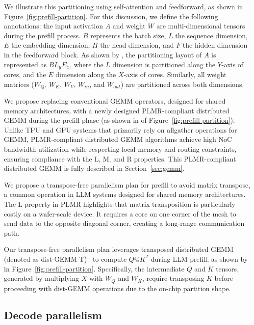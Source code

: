 We illustrate this partitioning using self-attention and feedforward, as shown in Figure~\ref{fig:prefill-partition}. For this discussion, we define the following annotations: the input activation $A$ and weight $W$ are multi-dimensional tensors during the prefill process. $B$ represents the batch size, $L$ the sequence dimension, $E$ the embedding dimension, $H$ the head dimension, and $F$ the hidden dimension in the feedforward block.
As shown by , the partitioning layout of $A$ is represented as $BL_yE_x$, where the $L$ dimension is partitioned along the $Y$-axis of cores, and the $E$ dimension along the $X$-axis of cores. Similarly, all weight matrices ($W_Q$, $W_K$, $W_V$, $W_{in}$, and $W_{out}$) are partitioned across both dimensions. 


We propose replacing conventional GEMM operators, designed for shared memory architectures, with a newly designed PLMR-compliant distributed GEMM during the prefill phase (as shown in  of Figure~\ref{fig:prefill-partition}). Unlike TPU and GPU systems that primarily rely on allgather operations for GEMM, PLMR-compliant distributed GEMM algorithms achieve high NoC bandwidth utilization while respecting local memory and routing constraints, ensuring compliance with the L, M, and R properties. This PLMR-compliant distributed GEMM is fully described in Section~\ref{sec:gemm}.

We propose a transpose-free parallelism plan for prefill to avoid matrix transpose, a common operation in LLM systems designed for shared memory architectures. The L property in PLMR highlights that matrix transposition is particularly costly on a wafer-scale device. It requires a core on one corner of the mesh to send data to the opposite diagonal corner, creating a long-range communication path.

Our transpose-free parallelism plan leverages transposed distributed GEMM (denoted as dist-GEMM-T)~\cite{summa, trans-dist} to compute $Q@K^T$ during LLM prefill, as shown by  in Figure~\ref{fig:prefill-partition}. Specifically, the intermediate $Q$ and $K$ tensors, generated by multiplying $X$ with $W_Q$ and $W_K$, require transposing $K$ before proceeding with dist-GEMM operations due to the on-chip partition shape.


    \vspace{-3mm}
\subsection{Decode parallelism}
    \vspace{-1mm}


